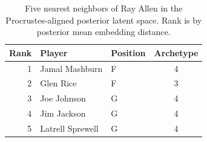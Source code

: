 \begin{table}[htbp]
  \centering\small
  \begin{tabular}{rllc}
    \toprule
    Rank & Player & Position & Archetype \\
    \midrule
    1 & Jamal Mashburn & F & 4 \\
    2 & Glen Rice & F & 3 \\
    3 & Joe Johnson & G & 4 \\
    4 & Jim Jackson & G & 4 \\
    5 & Latrell Sprewell & G & 4 \\
    \bottomrule
  \end{tabular}
  \caption{Five nearest neighbors of Ray Allen in the Procrustes-aligned posterior latent space. Rank is by posterior mean embedding distance.}
  \label{tab:Ray_Allen_neighbors}
\end{table}


